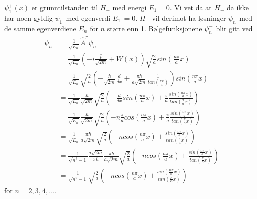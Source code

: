 \documentclass[norsk,a4paper,12pt]{article}
\begin{document}
$\psi_1^+(x)$ er grunntilstanden til $H_+$ med energi $E_1 = 0$. Vi vet da at $H_-$ da ikke har noen gyldig $\psi_1^-$ med egenverdi $E_1^- = 0$. $H_-$ vil derimot ha løsninger $\psi_n^-$ med de samme egenverdiene $E_n$ for $n$ større enn 1. Bølgefunksjonene $\psi_n^-$ blir gitt ved
\begin{equation}
\begin{aligned}
	\psi_n^- &= \frac{1}{\sqrt{E_n}}\hat{A}^\dagger \psi_n^+ \\
	&= \frac{1}{\sqrt{E_n}}(-i\frac{\hat{p}}{\sqrt{2m}} + W(x)) \sqrt{\frac{2}{a}} sin(\frac{n \pi}{a} x) \\
	&= \frac{1}{\sqrt{E_n}}\sqrt{\frac{2}{a}}( -\frac{\hbar}{\sqrt{2m}} \frac{d}{dx} + \frac{\pi\hbar}{a\sqrt{2m}}\frac{1}{tan(\frac{\pi x}{a})}) sin(\frac{n \pi}{a} x) \\
	&= \frac{1}{\sqrt{E_n}}\frac{\hbar}{\sqrt{2m}} \sqrt{\frac{2}{a}} (-\frac{d}{dx}sin(\frac{n \pi}{a} x) + \frac{\pi}{a}\frac{sin(\frac{n \pi}{a} x)}{tan(\frac{\pi}{a} x)}) \\
	&= \frac{1}{\sqrt{E_n}}\frac{\hbar}{\sqrt{2m}} \sqrt{\frac{2}{a}}  (-n\frac{\pi}{a} cos(\frac{n \pi}{a} x) + \frac{\pi}{a}\frac{sin(\frac{n \pi}{a} x)}{tan(\frac{\pi}{a} x)}) \\
	&= \frac{1}{\sqrt{E_n}}\frac{\pi \hbar}{a \sqrt{2m}} \sqrt{\frac{2}{a}}(-n cos(\frac{n \pi}{a} x) + \frac{sin(\frac{n \pi}{a} x)}{tan(\frac{\pi}{a} x)}) \\
	&= \frac{1}{\sqrt{n^2 - 1}} \frac{a\sqrt{2m}}{\pi \hbar} \frac{\pi \hbar}{a \sqrt{2m}} \sqrt{\frac{2}{a}}(-n cos(\frac{n \pi}{a} x) + \frac{sin(\frac{n \pi}{a} x)}{tan(\frac{\pi}{a} x)}) \\
	&= \frac{1}{\sqrt{n^2 - 1}} \sqrt{\frac{2}{a}}(-n cos(\frac{n \pi}{a} x) + \frac{sin(\frac{n \pi}{a} x)}{tan(\frac{\pi}{a} x)})
\end{aligned}
\end{equation}
for $n = 2, 3, 4, \dots$.
\end{document}
